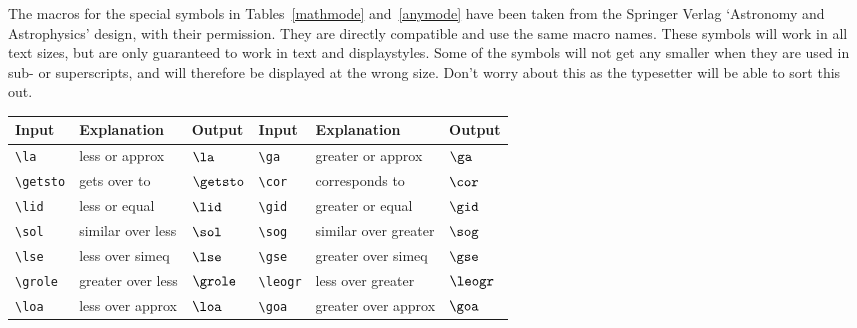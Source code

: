 The macros for the special symbols in Tables~\ref{mathmode} and~\ref{anymode}
have been taken from the Springer Verlag `Astronomy and Astrophysics' design,
with their permission. They are directly compatible and use the same macro
names. These symbols will work in all text sizes, but are only guaranteed to
work in text and displaystyles. Some of the symbols will not get any smaller
when they are used in sub- or superscripts, and will therefore be displayed at
the wrong size. Don't worry about this as the typesetter will be able to sort
this out.
%
\begin{table*}
\begin{minipage}{106mm}
\caption{Special symbols which can only be used in math mode.}\label{mathmode}
\begin{tabular}{@{}llllll}
Input & Explanation & Output & Input & Explanation & Output\\
\toprule
\verb"\la"     & less or approx       & $\la$     &
\verb"\ga"     & greater or approx    & $\ga$\\[2pt]
\verb"\getsto" & gets over to         & $\getsto$ &
\verb"\cor"    & corresponds to       & $\cor$\\[2pt]
\verb"\lid"    & less or equal        & $\lid$    &
\verb"\gid"    & greater or equal     & $\gid$\\[2pt]
\verb"\sol"    & similar over less    & $\sol$    &
\verb"\sog"    & similar over greater & $\sog$\\[2pt]
\verb"\lse"    & less over simeq      & $\lse$    &
\verb"\gse"    & greater over simeq   & $\gse$\\[2pt]
\verb"\grole"  & greater over less    & $\grole$  &
\verb"\leogr"  & less over greater    & $\leogr$\\[2pt]
\verb"\loa"    & less over approx     & $\loa$    &
\verb"\goa"    & greater over approx  & $\goa$\\
\bottomrule
\end{tabular}
\end{minipage}
\end{table*}
%
